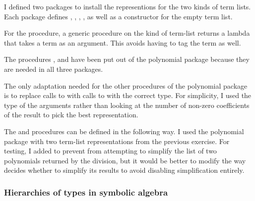 \begin{exe}[2.90]
    I defined two packages to install the representions for the two kinds of 
    term lists. Each package defines , , 
    , , as well as a constructor for the 
    empty term list.

    For the  procedure, a generic procedure on the kind of 
    term-list returns a lambda that takes a term as an argument. This avoids 
    having to tag the term as well.

    The procedures ,  and  have been put 
    out of the polynomial package because they are needed in all three packages.

    The only adaptation needed for the other procedures of the polynomial 
    package is to replace calls to  with calls to 
     with the correct type. For simplicity, I used the 
    type of the arguments rather than looking at the number of non-zero 
    coefficients of the result to pick the best representation.
\end{exe}

\begin{exe}[2.91]
    The  and  procedures can be defined in the 
    following way. I used the polynomial package with two term-list 
    representations from the previous exercise. For testing, I added
     to prevent  from 
    attempting to simplify the list of two polynomials returned by the division, 
    but it would be better to modify the way  decides 
    whether to simplify its results to avoid disabling simplification entirely.
\end{exe}

\subsubsection{Hierarchies of types in symbolic algebra}

